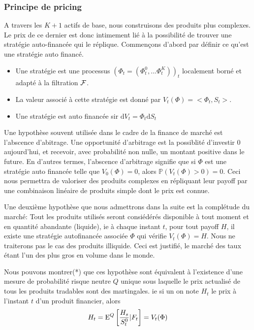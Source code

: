 \subsubsection{Principe de pricing}
A travers les $K+1$ actifs de base, nous construisons des produits plus complexes. 
Le prix de ce dernier est donc intimement lié à la possibilité de trouver une stratégie auto-financée qui le réplique.
Commençons d'abord par définir ce qu'est une stratégie auto financé.

\begin{defn}
  \begin{itemize}
  \item Une stratégie est une processus $(\Phi_t = (\Phi^0_t, ... \Phi^K_t))_t$ localement borné et adapté à la filtration $\cal{F}$.
  \item La valeur associé à cette stratégie est donné par $V_t(\Phi) = <\Phi_t, S_t>$.
  \item Une stratégie est auto financée sir $\mathrm{d}V_t = \Phi_t \mathrm{d}S_t$
  \end{itemize}

\end{defn}

Une hypothèse souvent utilisée dans le cadre de la finance de marché est l'abscence d'abitrage. Une opportunité d'arbitrage est la possiblité d'investir 0 aujourd'hui, et recevoir, avec probabilité non nulle, un montant positive dans le future. En d'autres termes, l'abscence d'arbitrage signifie que si $\Phi$ est une stratégie auto financée telle que $V_0(\Phi) = 0$, alors $\mathbb{P} ( V_t(\Phi) > 0 ) = 0$. Ceci nous permettra de valoriser des produits complexes en répliquant leur payoff par une combinaison linéaire de produits simple dont le prix est connue.

Une deuxième hypothèse que nous admettrons dans la suite est la complétude du marché: Tout les produits utilisés seront consiédérés disponible à tout moment et en quantité abandante (liquide), ie à chaque instant $t$, pour tout payoff $H$, il existe une stratégie autofinancée associée $\Phi$ qui vérifie $V_t( \Phi ) = H$. Nous ne traiterons pas le cas des produits illiquide. Ceci est justifié, le marché des taux étant l'un des plus gros en volume dans le monde.

Nous pouvons montrer(*) que ces hypothèse sont équivalent à l'existence d'une mesure de probabilité risque neutre $Q$ unique sous laquelle le prix actualisé de tous les produits tradables sont des martingales. ie si un on note $H_t$ le prix à l'instant $t$ d'un produit financier, alors
$$H_t =\mathrm{E}^Q \left[  \frac{H_s}{S^0_t} | F_t  \right] = V_t(\Phi)$$

